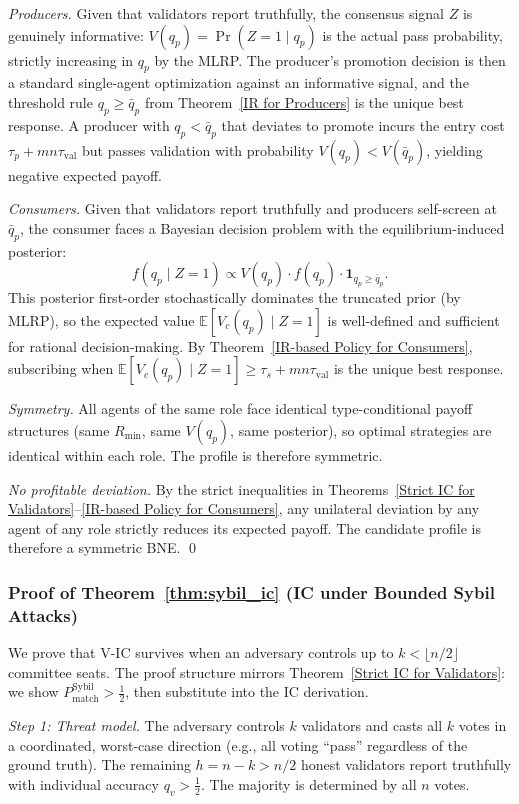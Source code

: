 \textit{Producers.} Given that validators report truthfully, the consensus signal $Z$ is genuinely informative: $V(q_p) = \Pr(Z = 1 \mid q_p)$ is the actual pass probability, strictly increasing in $q_p$ by the MLRP. The producer's promotion decision is then a standard single-agent optimization against an informative signal, and the threshold rule $q_p \geq \bar{q}_p$ from Theorem~\ref{IR for Producers} is the unique best response. A producer with $q_p < \bar{q}_p$ that deviates to promote incurs the entry cost $\tau_p + mn\tau_{\text{val}}$ but passes validation with probability $V(q_p) < V(\bar{q}_p)$, yielding negative expected payoff.

\textit{Consumers.} Given that validators report truthfully and producers self-screen at $\bar{q}_p$, the consumer faces a Bayesian decision problem with the equilibrium-induced posterior:
\[
f(q_p \mid Z = 1) \propto V(q_p) \cdot f(q_p) \cdot \mathbf{1}_{q_p \geq \bar{q}_p}.
\]
This posterior first-order stochastically dominates the truncated prior (by MLRP), so the expected value $\mathbb{E}[V_c(q_p) \mid Z = 1]$ is well-defined and sufficient for rational decision-making. By Theorem~\ref{IR-based Policy for Consumers}, subscribing when $\mathbb{E}[V_c(q_p) \mid Z = 1] \geq \tau_s + mn\tau_{\text{val}}$ is the unique best response.

\textit{Symmetry.} All agents of the same role face identical type-conditional payoff structures (same $R_{\min}$, same $V(q_p)$, same posterior), so optimal strategies are identical within each role. The profile is therefore symmetric.

\textit{No profitable deviation.} By the strict inequalities in Theorems~\ref{Strict IC for Validators}--\ref{IR-based Policy for Consumers}, any unilateral deviation by any agent of any role strictly reduces its expected payoff. The candidate profile is therefore a symmetric BNE. \qed


\subsubsection{Proof of Theorem~\ref{thm:sybil_ic} (IC under Bounded Sybil Attacks)}
\label{app:proof_sybil}

We prove that V-IC survives when an adversary controls up to $k < \lfloor n/2 \rfloor$ committee seats. The proof structure mirrors Theorem~\ref{Strict IC for Validators}: we show $P_{\text{match}}^{\text{Sybil}} > \frac{1}{2}$, then substitute into the IC derivation.

\textit{Step 1: Threat model.} The adversary controls $k$ validators and casts all $k$ votes in a coordinated, worst-case direction (e.g., all voting ``pass'' regardless of the ground truth). The remaining $h = n - k > n/2$ honest validators report truthfully with individual accuracy $q_v > \frac{1}{2}$. The majority is determined by all $n$ votes.

